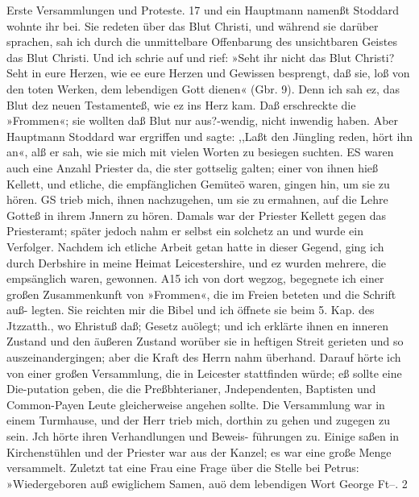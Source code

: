 Erste Versammlungen und Proteste. 17
und ein Hauptmann namenßt Stoddard wohnte ihr bei. Sie
redeten über das Blut Christi, und während sie darüber sprachen,
sah ich durch die unmittelbare Offenbarung des unsichtbaren
Geistes das Blut Christi. Und ich schrie auf und rief: »Seht
ihr nicht das Blut Christi? Seht in eure Herzen, wie ee eure
Herzen und Gewissen besprengt, daß sie, loß von den toten
Werken, dem lebendigen Gott dienen« (Gbr. 9). Denn ich sah
ez, das Blut dez neuen Testamenteß, wie ez ins Herz kam. Daß
erschreckte die »Frommen«; sie wollten daß Blut nur aus?-wendig,
nicht inwendig haben. Aber Hauptmann Stoddard war ergriffen
und sagte: ,,Laßt den Jüngling reden, hört ihn an«, alß er sah,
wie sie mich mit vielen Worten zu besiegen suchten.
ES waren auch eine Anzahl Priester da, die ster gottselig
galten; einer von ihnen hieß Kellett, und etliche, die empfänglichen
Gemüteö waren, gingen hin, um sie zu hören. GS trieb mich,
ihnen nachzugehen, um sie zu ermahnen, auf die Lehre Gotteß in
ihrem Jnnern zu hören. Damals war der Priester Kellett gegen
das Priesteramt; später jedoch nahm er selbst ein solchetz an und
wurde ein Verfolger.
Nachdem ich etliche Arbeit getan hatte in dieser Gegend,
ging ich durch Derbshire in meine Heimat Leicestershire, und
ez wurden mehrere, die empsänglich waren, gewonnen. A15 ich
von dort wegzog, begegnete ich einer großen Zusammenkunft
von »Frommen«, die im Freien beteten und die Schrift auß-
legten. Sie reichten mir die Bibel und ich öffnete sie beim 5. Kap.
des Jtzzatth., wo Ehristuß daß; Gesetz auölegt; und ich erklärte
ihnen en inneren Zustand und den äußeren Zustand worüber sie
in heftigen Streit gerieten und so auszeinandergingen; aber die
Kraft des Herrn nahm überhand.
Darauf hörte ich von einer großen Versammlung, die in
Leicester stattfinden würde; eß sollte eine Die-putation geben, die die
Preßbhterianer, Jndependenten, Baptisten und Common-Payen
Leute gleicherweise angehen sollte. Die Versammlung war in einem
Turmhause, und der Herr trieb mich, dorthin zu gehen und
zugegen zu sein. Jch hörte ihren Verhandlungen und Beweis-
führungen zu. Einige saßen in Kirchenstühlen und der Priester
war aus der Kanzel; es war eine große Menge versammelt.
Zuletzt tat eine Frau eine Frage über die Stelle bei Petrus:
»Wiedergeboren auß ewiglichem Samen, auö dem lebendigen Wort
George Ft--. 2



